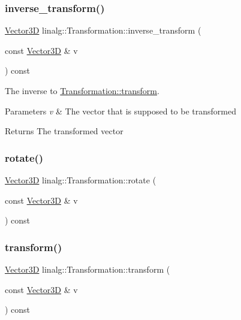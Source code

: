 \subsubsection{\texorpdfstring{inverse\_transform()}{inverse\_transform()}\hspace{0.1cm}{\footnotesize\ttfamily [2/2]}}
{\footnotesize\ttfamily \mbox{\hyperlink{classVector3D}{Vector3D}} linalg\+::\+Transformation\+::inverse\+\_\+transform (\begin{DoxyParamCaption}\item[{const \mbox{\hyperlink{classVector3D}{Vector3D}} \&}]{v }\end{DoxyParamCaption}) const}



The inverse to \mbox{\hyperlink{classlinalg_1_1Transformation_a069ec396b1a3addcb3400797a505b759}{Transformation\+::transform}}. 


\begin{DoxyParams}{Parameters}
{\em v} & The vector that is supposed to be transformed \\
\hline
\end{DoxyParams}
\begin{DoxyReturn}{Returns}
The transformed vector 
\end{DoxyReturn}
\mbox{\label{classlinalg_1_1Transformation_ac50039a4713ae9d5b9db7eeb1616d595}} 
\subsubsection{\texorpdfstring{rotate()}{rotate()}}
{\footnotesize\ttfamily \mbox{\hyperlink{classVector3D}{Vector3D}} linalg\+::\+Transformation\+::rotate (\begin{DoxyParamCaption}\item[{const \mbox{\hyperlink{classVector3D}{Vector3D}} \&}]{v }\end{DoxyParamCaption}) const}

\mbox{\label{classlinalg_1_1Transformation_a069ec396b1a3addcb3400797a505b759}} 
\subsubsection{\texorpdfstring{transform()}{transform()}\hspace{0.1cm}{\footnotesize\ttfamily [1/2]}}
{\footnotesize\ttfamily \mbox{\hyperlink{classVector3D}{Vector3D}} linalg\+::\+Transformation\+::transform (\begin{DoxyParamCaption}\item[{const \mbox{\hyperlink{classVector3D}{Vector3D}} \&}]{v }\end{DoxyParamCaption}) const}



